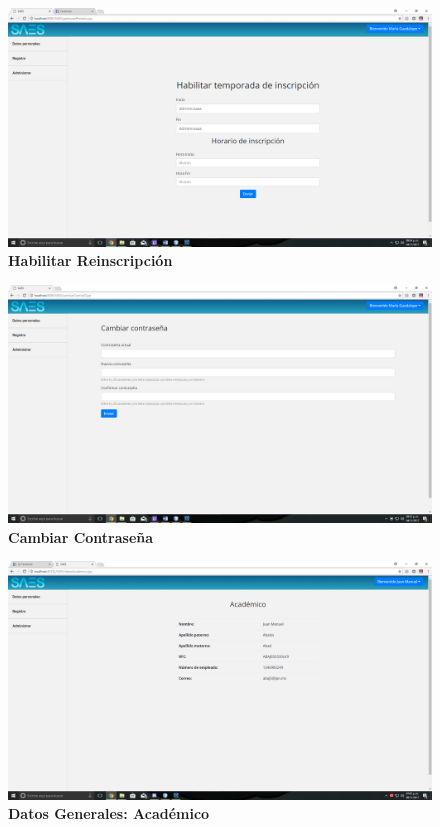 \begin{figure}[H]
  \centering
    \includegraphics[scale=0.2]{project/images/30.png}
  \caption{\textbf{Habilitar Reinscripción}}
\end{figure}
\begin{figure}[H]
  \centering
    \includegraphics[scale=0.2]{project/images/31.png}
  \caption{\textbf{Cambiar Contraseña}}
\end{figure}
\begin{figure}[H]
  \centering
    \includegraphics[scale=0.15]{project/images/53.png}
  \caption{\textbf{Datos Generales: Académico}}
\end{figure}
